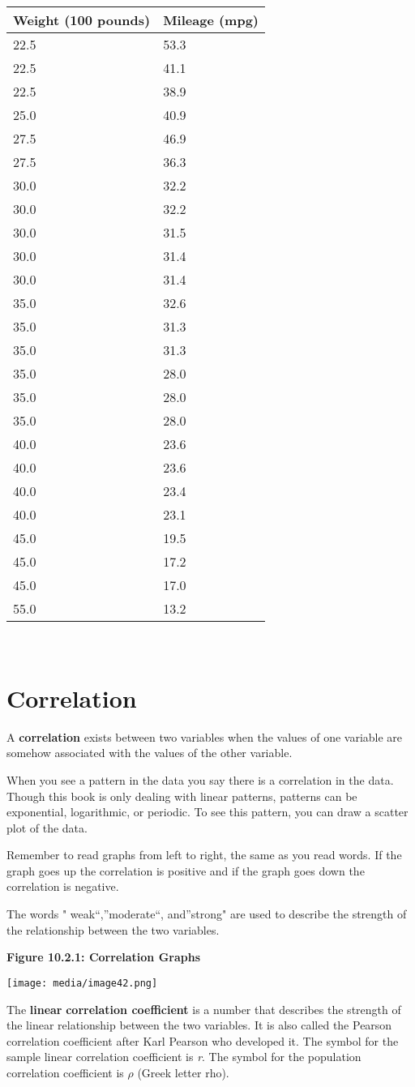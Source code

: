 \documentclass[]{book}
\begin{document}
\begin{longtable}[]{@{}ll@{}}
\toprule
Weight (100 pounds) & Mileage (mpg)\tabularnewline
\midrule
\endhead
22.5 & 53.3\tabularnewline
22.5 & 41.1\tabularnewline
22.5 & 38.9\tabularnewline
25.0 & 40.9\tabularnewline
27.5 & 46.9\tabularnewline
27.5 & 36.3\tabularnewline
30.0 & 32.2\tabularnewline
30.0 & 32.2\tabularnewline
30.0 & 31.5\tabularnewline
30.0 & 31.4\tabularnewline
30.0 & 31.4\tabularnewline
35.0 & 32.6\tabularnewline
35.0 & 31.3\tabularnewline
35.0 & 31.3\tabularnewline
35.0 & 28.0\tabularnewline
35.0 & 28.0\tabularnewline
35.0 & 28.0\tabularnewline
40.0 & 23.6\tabularnewline
40.0 & 23.6\tabularnewline
40.0 & 23.4\tabularnewline
40.0 & 23.1\tabularnewline
45.0 & 19.5\tabularnewline
45.0 & 17.2\tabularnewline
45.0 & 17.0\tabularnewline
55.0 & 13.2\tabularnewline
\bottomrule
\end{longtable}

\textbf{\\
}

\hypertarget{correlation}{%
\section{Correlation}\label{correlation}}

A \textbf{correlation} exists between two variables when the values of one variable are somehow associated with the values of the other variable.

When you see a pattern in the data you say there is a correlation in the data. Though this book is only dealing with linear patterns, patterns can be exponential, logarithmic, or periodic. To see this pattern, you can draw a scatter plot of the data.

Remember to read graphs from left to right, the same as you read words. If the graph goes up the correlation is positive and if the graph goes down the correlation is negative.

The words " weak``,''moderate``, and''strong" are used to describe the strength of the relationship between the two variables.

\textbf{Figure 10.2.1: Correlation Graphs}

\texttt{[image: media/image42.png]}

The \textbf{linear} \textbf{correlation coefficient} is a number that describes the strength of the linear relationship between the two variables. It is also called the Pearson correlation coefficient after Karl Pearson who developed it. The symbol for the sample linear correlation coefficient is \emph{r}. The symbol for the population correlation coefficient is \(\rho\) (Greek letter rho).
\end{document}
